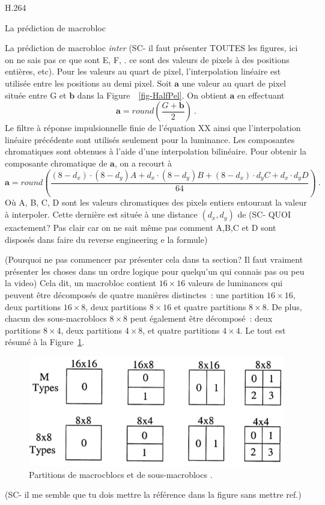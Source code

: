 \documentclass{article}
\begin{document}
\begin{section}{H.264}
\begin{subsection}{La prédiction de macrobloc}
\begin{subsubsection}{La prédiction de macrobloc \textit{inter}}
(SC- il faut présenter TOUTES les figures, ici on ne sais pas ce que sont E, F, . ce sont des valeurs de pixels à des positions entières, etc).
Pour les valeurs au quart de pixel, l'interpolation linéaire est utilisée entre les positions au demi pixel.
Soit $\mathbf{a}$ une valeur au quart de pixel située entre G et $\mathbf{b}$
dans la Figure~~\ref{fig-HalfPel}. On obtient $\mathbf{a}$ en effectuant
\begin{equation}
\mathbf{a} = round \left(\frac{G + \mathbf{b} }{2} \right)\:.
\end{equation}
Le filtre à réponse impulsionnelle finie de l'équation XX ainsi que l'interpolation linéaire précédente
sont utilisés seulement pour la luminance. Les
composantes chromatiques sont obtenues à l'aide d'une interpolation bilinéaire.
Pour obtenir la composante chromatique de $\mathbf{a}$, on a recourt à 
{\small\begin{equation}
\mathbf{a} = round \left( \frac{(8 - d_x) \cdot (8-d_y)A + d_x \cdot (8 - d_y)B
+ (8 - d_x) \cdot d_yC + d_x \cdot d_yD}{64} \right)\:.
\end{equation}} 
Où A, B, C, D sont les valeurs chromatiques des pixels entiers entourant la valeur à interpoler. Cette dernière est située à une distance $(d_x,d_y)$ de (SC- QUOI exactement? Pas clair car on ne sait même pas comment A,B,C et D sont disposés dans faire du reverse engineering e la formule)

(Pourquoi ne pas commencer par présenter cela dans ta section? Il faut vraiment présenter les choses dans un ordre logique pour quelqu'un qui connais pas ou peu la video)
Cela dit, un macrobloc contient $16 \times 16$ valeurs de luminances qui
peuvent être décomposés de quatre manières distinctes~: une partition $16 \times 16$,
deux partitions $16 \times 8$, deux partitions $8 \times 16$ et quatre
partitions $8 \times 8$. De plus, chacun des sous-macroblocs $8 \times 8$ peut
également être décomposé~: deux partitions $8 \times 4$, deux partitions $4 
\times
8$, et quatre partitions  $4 \times 4$. Le tout est résumé à la
Figure~\ref{fig-MacroblockPartitions}.

\begin{figure}[htb]
\centering
\includegraphics[scale=0.5]{images/MacroblockPartitions.png}
\caption{Partitions de macrocblocs et de sous-macroblocs
\cite{schafer2003}.}
\label{fig-MacroblockPartitions}
\end{figure}
(SC- il me semble que tu dois mettre la référence dans la figure sans mettre ref.)


\end{subsubsection}
\end{subsection}
\end{section}
\end{document}
